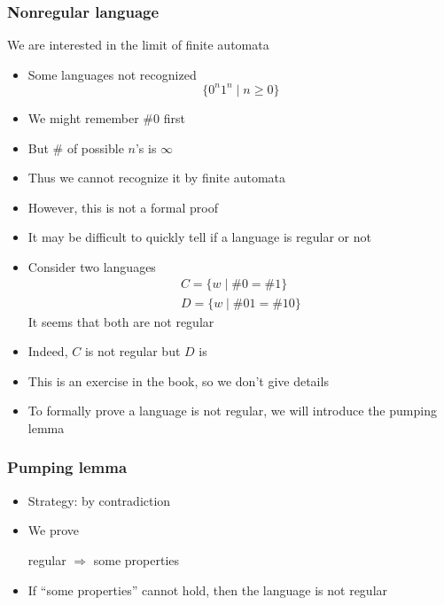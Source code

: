 




\begin{frame}[allowframebreaks] \frametitle{Nonregular language}
We are interested in the limit of finite automata
  \begin{itemize}
\item Some languages not recognized
  \begin{equation*}
    \{0^n 1^n \mid n \geq 0\}
  \end{equation*}
\item We might remember \#0 first

\item [] But \# of possible $n$'s is  $\infty$

\item Thus we cannot recognize it by finite automata

\item However, this is not a formal proof
\item It may be difficult to quickly tell if a language is
  regular or not
\item Consider two languages
  \begin{gather*}
    C=\{w\mid \#0=\#1\}\\
D=\{w \mid \#01=\#10\}
  \end{gather*}
It seems that both are not regular

\item [] Indeed, $C$ is not regular but $D$ is
\item [] This is an exercise in the book, so we don't give details
\item To formally prove a language is not regular, we will
  introduce the pumping lemma
\end{itemize}\end{frame} \begin{frame}[allowframebreaks] \frametitle{Pumping lemma}
  \begin{itemize}
\item Strategy: by contradiction
\item We prove
  \begin{center}
regular $\Rightarrow$ some properties    
  \end{center}
\item If ``some properties'' cannot hold, then the language is not
  regular


\end{itemize}
\end{frame}
